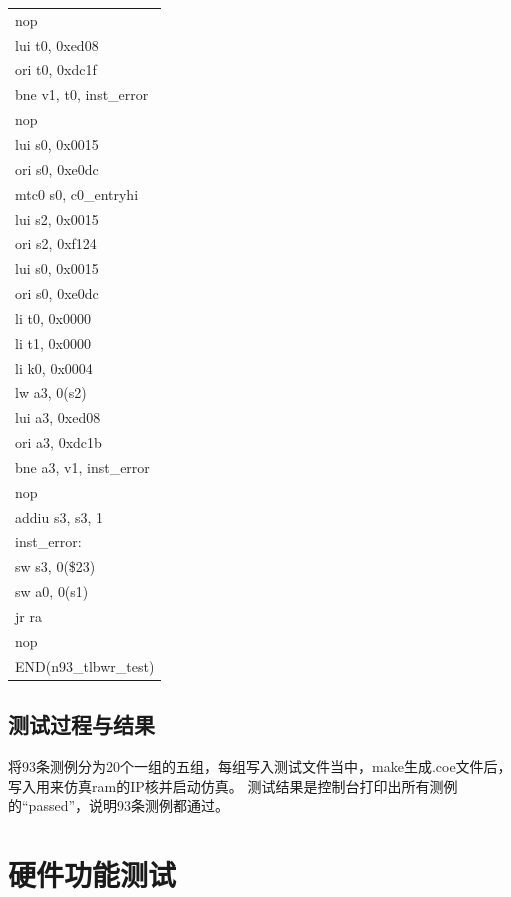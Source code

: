 \documentclass[11pt,utf8]{article}
\begin{document}
{{{\begin{center}
\begin{longtable}{p{15cm}}
{ }{ }{ }{ }nop\\
{ }{ }{ }{ }lui{ }t0,{ }0xed08\\
{ }{ }{ }{ }ori{ }t0,{ }0xdc1f\\
{ }{ }{ }{ }bne{ }v1,{ }t0,{ }inst\_error\\
{ }{ }{ }{ }nop\\
{ }{ }{ }{ }lui{ }s0,{ }0x0015\\
{ }{ }{ }{ }ori{ }s0,{ }0xe0dc\\
{ }{ }{ }{ }mtc0{ }s0,{ }c0\_entryhi\\
{ }{ }{ }{ }lui{ }s2,{ }0x0015\\
{ }{ }{ }{ }ori{ }s2,{ }0xf124\\
{ }{ }{ }{ }lui{ }s0,{ }0x0015\\
{ }{ }{ }{ }ori{ }s0,{ }0xe0dc\\
{ }{ }{ }{ }li{ }t0,{ }0x0000\\
{ }{ }{ }{ }li{ }t1,{ }0x0000\\
{ }{ }{ }{ }li{ }k0,{ }0x0004\\
{ }{ }{ }{ }lw{ }a3,{ }0(s2)\\
{ }{ }{ }{ }lui{ }a3,{ }0xed08\\
{ }{ }{ }{ }ori{ }a3,{ }0xdc1b\\
{ }{ }{ }{ }bne{ }a3,{ }v1,{ }inst\_error\\
{ }{ }{ }{ }nop\\
{ }{ }{ }{ }addiu{ }s3,{ }s3,{ }1\\
inst\_error:{ }{ }\\
{ }{ }{ }{ }sw{ }s3,{ }0(\$23)\\
{ }{ }{ }{ }sw{ }a0,{ }0(s1)\\
{ }{ }{ }{ }jr{ }ra\\
{ }{ }{ }{ }nop\\
END(n93\_tlbwr\_test)\\
		\hline
	\end{longtable}
\end{center}
}
\subsection{测试过程与结果} {
将93条测例分为20个一组的五组，每组写入测试文件当中，make生成.coe文件后，写入用来仿真ram的IP核并启动仿真。
测试结果是控制台打印出所有测例的“passed”，说明93条测例都通过。
}
}

\section{硬件功能测试} {
}}
\end{document}
